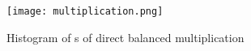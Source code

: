 \begin{figure}[hp]
  \centering
  \texttt{[image: multiplication.png]}
  \caption{Histogram of \hammingw s of direct balanced multiplication}
  \label{fig:mult}
\end{figure}




